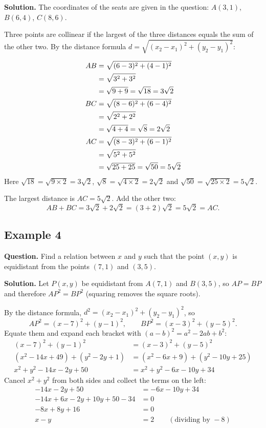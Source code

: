 \textbf{Solution.} The coordinates of the seats are given in the question: $A(3,1)$, $B(6,4)$, $C(8,6)$.

Three points are collinear if the largest of the three distances equals the sum of the other two. By the distance formula $d=\sqrt{(x_2-x_1)^2+(y_2-y_1)^2}$:

\distnote
\begin{align*}
\dist{AB}{3}{1}{6}{4}{3\sqrt2}\\
\dist{BC}{6}{4}{8}{6}{2\sqrt2}\\
\dist{AC}{3}{1}{8}{6}{5\sqrt2}
\end{align*}
Here $\sqrt{18}=\sqrt{9\times2}=3\sqrt2$, $\sqrt8=\sqrt{4\times2}=2\sqrt2$ and $\sqrt{50}=\sqrt{25\times2}=5\sqrt2$.

The largest distance is $AC=5\sqrt2$. Add the other two:
\[
AB+BC=3\sqrt2+2\sqrt2=(3+2)\sqrt2=5\sqrt2=AC .
\]

\subsection*{Example 4}
\textbf{Question.} Find a relation between $x$ and $y$ such that the point $(x,y)$ is equidistant from the points $(7,1)$ and $(3,5)$.

\textbf{Solution.} Let $P(x,y)$ be equidistant from $A(7,1)$ and $B(3,5)$, so $AP=BP$ and therefore $AP^2=BP^2$ (squaring removes the square roots).

By the distance formula, $d^2=(x_2-x_1)^2+(y_2-y_1)^2$, so
\[
AP^2=(x-7)^2+(y-1)^2,\qquad BP^2=(x-3)^2+(y-5)^2 .
\]
Equate them and expand each bracket with $(a-b)^2=a^2-2ab+b^2$:
\begin{align*}
(x-7)^2+(y-1)^2&=(x-3)^2+(y-5)^2\\
(x^2-14x+49)+(y^2-2y+1)&=(x^2-6x+9)+(y^2-10y+25)\\
x^2+y^2-14x-2y+50&=x^2+y^2-6x-10y+34
\end{align*}
Cancel $x^2+y^2$ from both sides and collect the terms on the left:
\begin{align*}
-14x-2y+50&=-6x-10y+34\\
-14x+6x-2y+10y+50-34&=0\\
-8x+8y+16&=0\\
x-y&=2\qquad(\text{dividing by }-8)
\end{align*}


